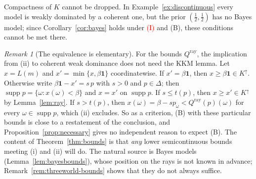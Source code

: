 \documentclass[11pt]{article}
\theoremstyle{definition}
\theoremstyle{remark}
\newtheorem{remark}[theorem]{Remark}
\newcommand{\one}{\mathbf 1}
\newcommand{\supp}{\operatorname{supp}}
\begin{document}
Compactness of $K$ cannot be dropped. In Example~\ref{ex:discontinuous} every model is weakly dominated by a coherent one, but the prior $(\tfrac12,\tfrac12)$ has no Bayes model; since Corollary~\ref{cor:bayes} holds under \textcolor{red}{(I)} and (B), these conditions cannot be met there.

\begin{remark}[The equivalence is elementary]\label{rem:elementary}
For the bounds $Q^{\mathrm{ray}}$, the implication from (ii) to coherent weak dominance does not need the KKM lemma. Let $x=L(m)$ and $x'=\min\{x,\beta\one\}$ coordinatewise. If $x'=\beta\one$, then $x\ge \beta\one\in K^\uparrow$. Otherwise write $\beta\one-x'=s\,p$ with $s>0$ and $p\in\Delta$; then $\supp p=\{\omega:x(\omega)<\beta\}$ and $x=x'$ on $\supp p$. If $s\le t(p)$, then $x\ge x'\in K^\uparrow$ by Lemma~\ref{lem:ray}. If $s>t(p)$, then $x(\omega)=\beta-sp_\omega<Q^{\mathrm{ray}}(p)(\omega)$ for every $\omega\in\supp p$, which (ii) excludes. So as a criterion, (B) with these particular bounds is close to a restatement of the conclusion, and Proposition~\ref{prop:necessary} gives no independent reason to expect (B). The content of Theorem~\ref{thm:bounds} is that \emph{any} lower semicontinuous bounds meeting (i) and (ii) will do. The natural source is Bayes models (Lemma~\ref{lem:bayesbounds}), whose position on the rays is not known in advance; Remark~\ref{rem:threeworld-bounds} shows that they do not always suffice.
\end{remark}
\end{document}
